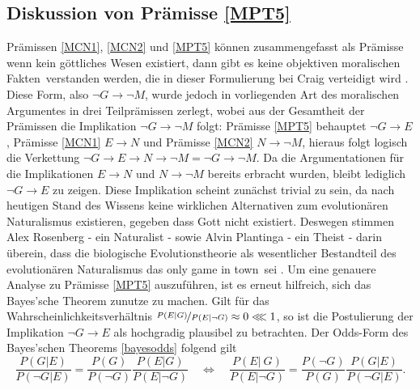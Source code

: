 \documentclass[a4paper,11pt]{article}
\numberwithin{equation}{section}
\begin{document}
\subsection{Diskussion von Prämisse \ref{MPT5}}
Prämissen \ref{MCN1}, \ref{MCN2} und \ref{MPT5} können zusammengefasst als Prämisse \flqq wenn kein göttliches Wesen existiert, dann gibt es keine objektiven moralischen Fakten\frqq\ verstanden werden, die in dieser Formulierung bei Craig verteidigt wird \cite[S. 172-183]{Craig.2009}. Diese Form, also $\neg G \rightarrow \neg M$, wurde jedoch in vorliegenden Art des moralischen Argumentes in drei Teilprämissen zerlegt, wobei aus der Gesamtheit der Prämissen die Implikation $\neg G \rightarrow \neg M$ folgt: Prämisse \ref{MPT5} behauptet $\neg G \rightarrow E$, Prämisse \ref{MCN1} $E \rightarrow N$ und Prämisse \ref{MCN2} $N \rightarrow \neg M$, hieraus folgt logisch die Verkettung $\neg G \rightarrow E \rightarrow N \rightarrow \neg M = \neg G \rightarrow \neg M$. Da die Argumentationen für die Implikationen $E \rightarrow N$ und $N \rightarrow \neg M$ bereits erbracht wurden, bleibt lediglich $\neg G \rightarrow E$ zu zeigen. Diese Implikation scheint zunächst trivial zu sein, da nach heutigen Stand des Wissens keine wirklichen Alternativen zum evolutionären Naturalismus existieren, gegeben dass Gott nicht existiert. Deswegen stimmen Alex Rosenberg - ein Naturalist - sowie Alvin Plantinga - ein Theist - darin überein, dass die biologische Evolutionstheorie als wesentlicher Bestandteil des evolutionären Naturalismus das \flqq only game in town\frqq\ sei \cite[S. 394]{Linville2009-LINTMA-2}. Um eine genauere Analyse zu Prämisse \ref{MPT5} auszuführen, ist es erneut hilfreich, sich das Bayes'sche Theorem zunutze zu machen. Gilt für das Wahrscheinlichkeitsverhältnis $\nicefrac{P(E|G)}{P(E|\neg G)} \approx 0 \lll 1$, so ist die Postulierung der Implikation $\neg G \rightarrow E$ als hochgradig plausibel zu betrachten. Der Odds-Form des Bayes'schen Theorems \eqref{bayesodds} folgend gilt \begin{equation}\label{bayespremiss5state}
\frac{P(G|E)}{P(\neg G|E)}=\frac{P(G)}{P(\neg G)}\frac{P(E|G)}{P(E|\neg G)} \quad \Leftrightarrow \quad \frac{P(E|\ G)}{P(E|\neg G)}=\frac{P(\neg G)}{P(G)}\frac{P(G|E)}{P(\neg G|E)}.

\end{equation}
\end{document}
